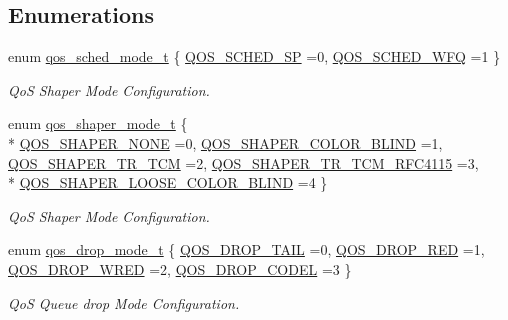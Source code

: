 \subsection*{Enumerations}
\begin{DoxyCompactItemize}
\item 
enum \hyperlink{group__FAPI__QOS__QUEUE_ga1239e331f224c9a00c3047d30edaa939}{qos\-\_\-sched\-\_\-mode\-\_\-t} \{ \hyperlink{group__FAPI__QOS__QUEUE_gga1239e331f224c9a00c3047d30edaa939ab36224a8020ac797bd5d288416b8a60c}{Q\-O\-S\-\_\-\-S\-C\-H\-E\-D\-\_\-\-S\-P} =0, 
\hyperlink{group__FAPI__QOS__QUEUE_gga1239e331f224c9a00c3047d30edaa939ad4c9d46debeaa176ead4f39ce6749586}{Q\-O\-S\-\_\-\-S\-C\-H\-E\-D\-\_\-\-W\-F\-Q} =1
 \}
\begin{DoxyCompactList}\small\item\em Qo\-S Shaper Mode Configuration. \end{DoxyCompactList}\item 
enum \hyperlink{group__FAPI__QOS__QUEUE_ga59365e8b97823ce54ac3e627abc95dd5}{qos\-\_\-shaper\-\_\-mode\-\_\-t} \{ \\*
\hyperlink{group__FAPI__QOS__QUEUE_gga59365e8b97823ce54ac3e627abc95dd5aeaf9faef4573eeaba7034840720cce37}{Q\-O\-S\-\_\-\-S\-H\-A\-P\-E\-R\-\_\-\-N\-O\-N\-E} =0, 
\hyperlink{group__FAPI__QOS__QUEUE_gga59365e8b97823ce54ac3e627abc95dd5a29fea50ad673068f3d2b59ba8676998e}{Q\-O\-S\-\_\-\-S\-H\-A\-P\-E\-R\-\_\-\-C\-O\-L\-O\-R\-\_\-\-B\-L\-I\-N\-D} =1, 
\hyperlink{group__FAPI__QOS__QUEUE_gga59365e8b97823ce54ac3e627abc95dd5acc40218e63ca2f3fba38c8f98c9a0832}{Q\-O\-S\-\_\-\-S\-H\-A\-P\-E\-R\-\_\-\-T\-R\-\_\-\-T\-C\-M} =2, 
\hyperlink{group__FAPI__QOS__QUEUE_gga59365e8b97823ce54ac3e627abc95dd5ad63abd52de51f0b633cab8c41633f249}{Q\-O\-S\-\_\-\-S\-H\-A\-P\-E\-R\-\_\-\-T\-R\-\_\-\-T\-C\-M\-\_\-\-R\-F\-C4115} =3, 
\\*
\hyperlink{group__FAPI__QOS__QUEUE_gga59365e8b97823ce54ac3e627abc95dd5a346472924caeb95880bc570c4b92118b}{Q\-O\-S\-\_\-\-S\-H\-A\-P\-E\-R\-\_\-\-L\-O\-O\-S\-E\-\_\-\-C\-O\-L\-O\-R\-\_\-\-B\-L\-I\-N\-D} =4
 \}
\begin{DoxyCompactList}\small\item\em Qo\-S Shaper Mode Configuration. \end{DoxyCompactList}\item 
enum \hyperlink{group__FAPI__QOS__QUEUE_gac3dd371b02e4e2ff5023eaa49dfd7aab}{qos\-\_\-drop\-\_\-mode\-\_\-t} \{ \hyperlink{group__FAPI__QOS__QUEUE_ggac3dd371b02e4e2ff5023eaa49dfd7aabad633473386b40a2abf8c8bbaf6347b90}{Q\-O\-S\-\_\-\-D\-R\-O\-P\-\_\-\-T\-A\-I\-L} =0, 
\hyperlink{group__FAPI__QOS__QUEUE_ggac3dd371b02e4e2ff5023eaa49dfd7aaba52861308ec9d0b27383e658a4b1a2929}{Q\-O\-S\-\_\-\-D\-R\-O\-P\-\_\-\-R\-E\-D} =1, 
\hyperlink{group__FAPI__QOS__QUEUE_ggac3dd371b02e4e2ff5023eaa49dfd7aaba0ec07d74821ef58ed141af01e60a8d4f}{Q\-O\-S\-\_\-\-D\-R\-O\-P\-\_\-\-W\-R\-E\-D} =2, 
\hyperlink{group__FAPI__QOS__QUEUE_ggac3dd371b02e4e2ff5023eaa49dfd7aabafbbcf309cee7513222292d89a35de80b}{Q\-O\-S\-\_\-\-D\-R\-O\-P\-\_\-\-C\-O\-D\-E\-L} =3
 \}
\begin{DoxyCompactList}\small\item\em Qo\-S Queue drop Mode Configuration. \end{DoxyCompactList}\end{DoxyCompactItemize}
